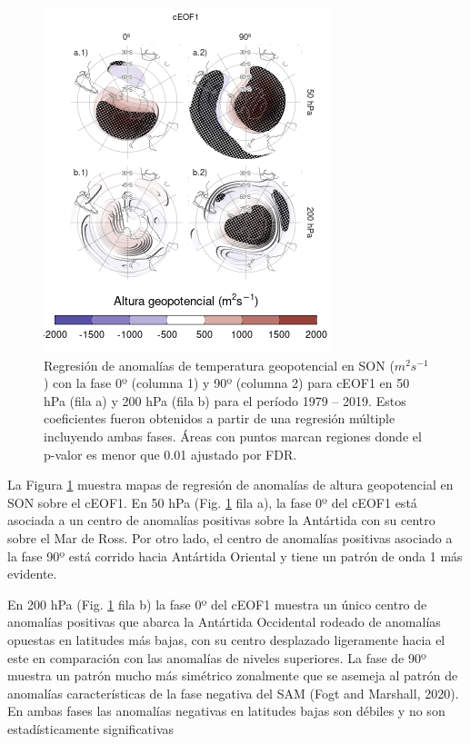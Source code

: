 \documentclass[12pt,oneside]{reedthesis}
\begin{document}
\begin{figure}
\includegraphics{figures/20-ceofs/eof1-regr-gh-1} \caption{Regresión de anomalías de temperatura geopotencial en SON (\(m^2s^{-1}\)) con la fase 0º (columna 1) y 90º (columna 2) para cEOF1 en 50 hPa (fila a) y 200 hPa (fila b) para el período 1979 -- 2019.
Estos coeficientes fueron obtenidos a partir de una regresión múltiple incluyendo ambas fases.
Áreas con puntos marcan regiones donde el p-valor es menor que 0.01 ajustado por FDR.}\label{fig:eof1-regr-gh}
\end{figure}

La Figura \ref{fig:eof1-regr-gh} muestra mapas de regresión de anomalías de altura geopotencial en SON sobre el cEOF1.
En 50 hPa (Fig. \ref{fig:eof1-regr-gh} fila a), la fase 0º del cEOF1 está asociada a un centro de anomalías positivas sobre la Antártida con su centro sobre el Mar de Ross.
Por otro lado, el centro de anomalías positivas asociado a la fase 90º está corrido hacia Antártida Oriental y tiene un patrón de onda 1 más evidente.

En 200 hPa (Fig. \ref{fig:eof1-regr-gh} fila b) la fase 0º del cEOF1 muestra un único centro de anomalías positivas que abarca la Antártida Occidental rodeado de anomalías opuestas en latitudes más bajas, con su centro desplazado ligeramente hacia el este en comparación con las anomalías de niveles superiores.
La fase de 90º muestra un patrón mucho más simétrico zonalmente que se asemeja al patrón de anomalías características de la fase negativa del SAM (Fogt and Marshall, 2020).
En ambas fases las anomalías negativas en latitudes bajas son débiles y no son estadísticamente significativas
\end{document}
